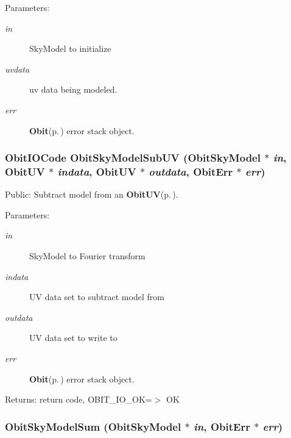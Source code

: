 \begin{Desc}
\item[Parameters:]
\begin{description}
\item[{\em in}]Sky\-Model to initialize \item[{\em uvdata}]uv data being modeled. \item[{\em err}]{\bf Obit}{\rm (p.\,\pageref{structObit})} error stack object. \end{description}
\end{Desc}
\subsubsection{\setlength{\rightskip}{0pt plus 5cm}Obit\-IOCode Obit\-Sky\-Model\-Sub\-UV ({\bf Obit\-Sky\-Model} $\ast$ {\em in}, {\bf Obit\-UV} $\ast$ {\em indata}, {\bf Obit\-UV} $\ast$ {\em outdata}, {\bf Obit\-Err} $\ast$ {\em err})}\label{ObitSkyModel_8h_a57}


Public: Subtract model from an {\bf Obit\-UV}{\rm (p.\,\pageref{structObitUV})}. 

\begin{Desc}
\item[Parameters:]
\begin{description}
\item[{\em in}]Sky\-Model to Fourier transform \item[{\em indata}]UV data set to subtract model from \item[{\em outdata}]UV data set to write to \item[{\em err}]{\bf Obit}{\rm (p.\,\pageref{structObit})} error stack object. \end{description}
\end{Desc}
\begin{Desc}
\item[Returns:]return code, OBIT\_\-IO\_\-OK=$>$ OK \end{Desc}
\subsubsection{ Obit\-Sky\-Model\-Sum ({\bf Obit\-Sky\-Model} $\ast$ {\em in}, {\bf Obit\-Err} $\ast$ {\em err})}\label{ObitSkyModel_8h_a67}



